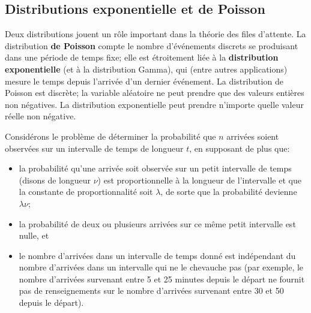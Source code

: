 \subsection{Distributions exponentielle et de Poisson}
Deux distributions jouent un rôle important dans la théorie des files d'attente. La distribution \textbf{de Poisson} compte le nombre d'événements discrets se produisant dans une période de temps fixe; elle est étroitement liée à la \textbf{distribution exponentielle} (et à la distribution Gamma), qui (entre autres applications) mesure le temps depuis l'arrivée d’un dernier événement. La distribution de Poisson est discrète; la variable aléatoire ne peut prendre que des valeurs entières non négatives. La distribution exponentielle peut prendre n'importe quelle valeur réelle non négative.
\par Considérons le problème de déterminer la probabilité que $n$ arrivées soient observées sur un intervalle de temps de longueur $t$, en supposant de plus que:
\begin{itemize}
\item la probabilité qu'une arrivée soit observée sur un petit intervalle de temps (disons de longueur $\nu$) est proportionnelle à la longueur de l'intervalle et que la constante de proportionnalité soit $\lambda$, de sorte que la probabilité devienne $\lambda\nu$;
\item la probabilité de deux ou plusieurs arrivées sur ce même petit intervalle est nulle, et 
\item le nombre d'arrivées dans un intervalle de temps donné est indépendant du nombre d’arrivées dans un intervalle qui ne le chevauche pas (par exemple, le nombre d'arrivées survenant entre 5 et 25 minutes depuis le départ ne fournit pas de renseignements sur le nombre d'arrivées survenant entre  30 et 50 depuis le départ).
\end{itemize}
